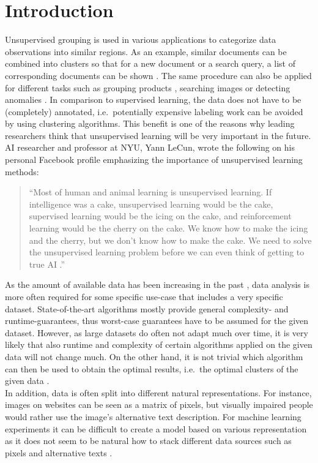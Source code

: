 \chapter{Introduction}


Unsupervised grouping is used in various applications to categorize data observations into similar regions. As an example, similar documents can be combined into clusters so that for a new document or a search query, a list of corresponding documents can be shown \cite{zamir1998web}. The same procedure can also be applied for different tasks such as grouping products \cite{balakrishnan2018product}, searching images \cite{lin2018dimensionality} or detecting anomalies \cite{he2003discovering}. In comparison to supervised learning, the data does not have to be (completely) annotated, i.e.\ potentially expensive labeling work can be avoided by using clustering algorithms. This benefit is one of the reasons why leading researchers think that unsupervised learning will be very important in the future. AI researcher and professor at NYU, Yann LeCun, wrote the following on his personal Facebook profile emphasizing the importance of unsupervised learning methods:

\blockquote{``Most of human and animal learning is unsupervised learning. If intelligence was a cake, unsupervised learning would be the cake, supervised learning would be the icing on the cake, and reinforcement learning would be the cherry on the cake. We know how to make the icing and the cherry, but we don’t know how to make the cake. We need to solve the unsupervised learning problem before we can even think of getting to true AI \cite{lecun}.''}

As the amount of available data has been increasing in the past \cite{wamba2015big}, data analysis is more often required for some specific use-case that includes a very specific dataset. State-of-the-art algorithms mostly provide general complexity- and runtime-guarantees, thus worst-case guarantees have to be assumed for the given dataset. However, as large datasets do often not adapt much over time, it is very likely that also runtime and complexity of certain algorithms applied on the given data will not change much. On the other hand, it is not trivial which algorithm can then be used to obtain the optimal results, i.e.\ the optimal clusters of the given data \cite{DBLP:journals/corr/GuptaR15b}.\\

In addition, data is often split into different natural representations. For instance, images on websites can be seen as a matrix of pixels, but visually impaired people would rather use the image's alternative text description. For machine learning experiments it can be difficult to create a model based on various representation as it does not seem to be natural how to stack different data sources such as pixels and alternative texts \cite{cebral2018combining}.\\

